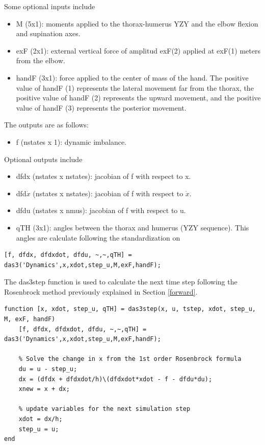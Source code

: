 Some optional inputs include
\begin{itemize}
    \item M (5x1): moments applied to the thorax-humerus YZY and the elbow flexion and supination axes.
    \item exF (2x1): external vertical force of amplitud exF(2) applied at exF(1) meters from the elbow.
    \item handF (3x1): force applied to the center of mass of the hand. The positive value of handF (1) represents the lateral movement far from the thorax, the positive value of handF (2) represents the upward movement, and the positive value of handF (3) represents the posterior movement.
\end{itemize}

The outputs are as follows:

\begin{itemize}
    \item f (nstates x 1): dynamic imbalance.
\end{itemize}

Optional outputs include
\begin{itemize}
    \item dfdx (nstates x nstates): jacobian of f with respect to x.
    \item dfd$\dot{x}$ (nstates x nstates): jacobian of f with respect to $\dot{x}$.
    \item dfdu (nstates x nmus): jacobian of f with respect to u.
    \item qTH (3x1): angles between the thorax and humerus (YZY sequence). This angles are calculate following the standardization on \cite{ISB}
\end{itemize}
\begin{lstlisting}[style=Matlab-editor]
[f, dfdx, dfdxdot, dfdu, ~,~,qTH] = das3('Dynamics',x,xdot,step_u,M,exF,handF);
\end{lstlisting}

The das3step function is used to calculate the next time step following the Rosenbrock method previously explained in Section \ref{forward}.

\begin{lstlisting}[style=Matlab-editor]
function [x, xdot, step_u, qTH] = das3step(x, u, tstep, xdot, step_u, M, exF, handF)
    [f, dfdx, dfdxdot, dfdu, ~,~,qTH] = das3('Dynamics',x,xdot,step_u,M,exF,handF);
    
	% Solve the change in x from the 1st order Rosenbrock formula
	du = u - step_u;
	dx = (dfdx + dfdxdot/h)\(dfdxdot*xdot - f - dfdu*du);
	xnew = x + dx;
	
	% update variables for the next simulation step
	xdot = dx/h;
	step_u = u;
end
\end{lstlisting}


